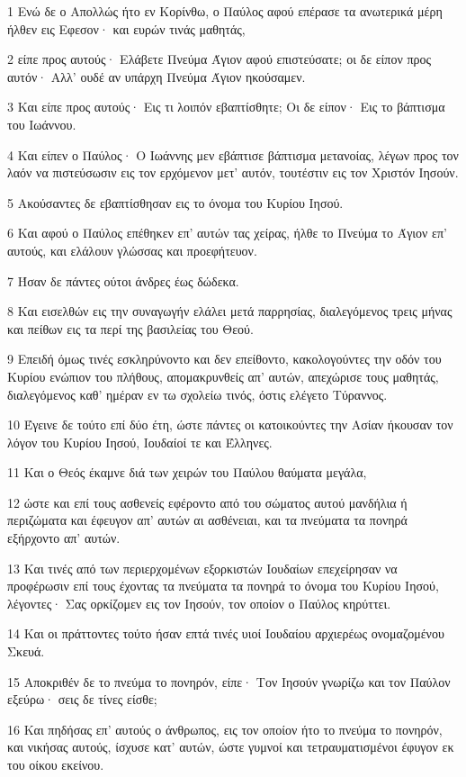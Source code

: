 \par 1 Ενώ δε ο Απολλώς ήτο εν Κορίνθω, ο Παύλος αφού επέρασε τα ανωτερικά μέρη ήλθεν εις Εφεσον· και ευρών τινάς μαθητάς,
\par 2 είπε προς αυτούς· Ελάβετε Πνεύμα Άγιον αφού επιστεύσατε; οι δε είπον προς αυτόν· Αλλ' ουδέ αν υπάρχη Πνεύμα Άγιον ηκούσαμεν.
\par 3 Και είπε προς αυτούς· Εις τι λοιπόν εβαπτίσθητε; Οι δε είπον· Εις το βάπτισμα του Ιωάννου.
\par 4 Και είπεν ο Παύλος· Ο Ιωάννης μεν εβάπτισε βάπτισμα μετανοίας, λέγων προς τον λαόν να πιστεύσωσιν εις τον ερχόμενον μετ' αυτόν, τουτέστιν εις τον Χριστόν Ιησούν.
\par 5 Ακούσαντες δε εβαπτίσθησαν εις το όνομα του Κυρίου Ιησού.
\par 6 Και αφού ο Παύλος επέθηκεν επ' αυτών τας χείρας, ήλθε το Πνεύμα το Άγιον επ' αυτούς, και ελάλουν γλώσσας και προεφήτευον.
\par 7 Ήσαν δε πάντες ούτοι άνδρες έως δώδεκα.
\par 8 Και εισελθών εις την συναγωγήν ελάλει μετά παρρησίας, διαλεγόμενος τρεις μήνας και πείθων εις τα περί της βασιλείας του Θεού.
\par 9 Επειδή όμως τινές εσκληρύνοντο και δεν επείθοντο, κακολογούντες την οδόν του Κυρίου ενώπιον του πλήθους, απομακρυνθείς απ' αυτών, απεχώρισε τους μαθητάς, διαλεγόμενος καθ' ημέραν εν τω σχολείω τινός, όστις ελέγετο Τύραννος.
\par 10 Έγεινε δε τούτο επί δύο έτη, ώστε πάντες οι κατοικούντες την Ασίαν ήκουσαν τον λόγον του Κυρίου Ιησού, Ιουδαίοί τε και Έλληνες.
\par 11 Και ο Θεός έκαμνε διά των χειρών του Παύλου θαύματα μεγάλα,
\par 12 ώστε και επί τους ασθενείς εφέροντο από του σώματος αυτού μανδήλια ή περιζώματα και έφευγον απ' αυτών αι ασθένειαι, και τα πνεύματα τα πονηρά εξήρχοντο απ' αυτών.
\par 13 Και τινές από των περιερχομένων εξορκιστών Ιουδαίων επεχείρησαν να προφέρωσιν επί τους έχοντας τα πνεύματα τα πονηρά το όνομα του Κυρίου Ιησού, λέγοντες· Σας ορκίζομεν εις τον Ιησούν, τον οποίον ο Παύλος κηρύττει.
\par 14 Και οι πράττοντες τούτο ήσαν επτά τινές υιοί Ιουδαίου αρχιερέως ονομαζομένου Σκευά.
\par 15 Αποκριθέν δε το πνεύμα το πονηρόν, είπε· Τον Ιησούν γνωρίζω και τον Παύλον εξεύρω· σεις δε τίνες είσθε;
\par 16 Και πηδήσας επ' αυτούς ο άνθρωπος, εις τον οποίον ήτο το πνεύμα το πονηρόν, και νικήσας αυτούς, ίσχυσε κατ' αυτών, ώστε γυμνοί και τετραυματισμένοι έφυγον εκ του οίκου εκείνου.
